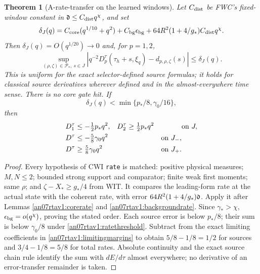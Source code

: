 \documentclass[11pt]{article}
\numberwithin{equation}{section}
\newtheorem{theorem}{Theorem}[section]
\begin{document}
\begin{theorem}[A-rate-transfer on the learned windows]
\label{an07rtav1:ratetransfer}
Let \(C_{\rm dist}\) be FWC's fixed-window constant in
\(\mathfrak d\le C_{\rm dist}q^\chi\), and set
\begin{equation}
 \delta_J(q)=C_{\rm core}(q^{1/10}+q^2)
      +C_{\rm bg}\epsilon_{\rm bg}
      +64R^2(1+4/g_*)C_{\rm dist}q^\chi.
 \label{an07rtav1:deltaJ}
\end{equation}
Then \(\delta_J(q)=O(q^{1/20})\to0\) and, for \(p=1,2\),
\begin{equation}
 \sup_{(\rho,\zeta)\in\mathcal P_*,\ s\in J}
 |q^{-2}D_p^\tau(\tau_h+s,\xi_q)-d_{p,\rho,\zeta}(s)|
                       \le\delta_J(q).
 \label{an07rtav1:ratelimit}
\end{equation}
This is uniform for the exact selector-defined source formulas;
it holds for classical source derivatives wherever defined and
in the almost-everywhere time sense. There is no core gate hit.
If
\begin{equation}
 \delta_J(q)<\min\{p_*/8,\gamma_0/16\},
 \label{an07rtav1:ratethreshold}
\end{equation}
then
\begin{align}
 D_1^\tau&\le-\tfrac12p_*q^2,&
 D_2^\tau&\ge\tfrac12p_*q^2&&\text{on }J,\notag\\
 D^\tau&\le-\tfrac58\gamma_0q^2&&&\text{on }J_-,\notag\\
 D^\tau&\ge\tfrac58\gamma_0q^2&&&\text{on }J_+.
 \label{an07rtav1:originalmargins}
\end{align}
\end{theorem}
\begin{proof}
Every hypothesis of CWI \texttt{rate} is matched: positive
physical measures; \(M,N\le2\); bounded strong support and
comparator; finite weak first moments; same \(\rho\); and
\(\zeta-X_*\ge g_*/4\) from WIT. It compares the leading-form
rate at the actual state with the coherent rate, with error
\(64R^2(1+4/g_*)\mathfrak d\). Apply it after
Lemmas \ref{an07rtav1:corerate} and
\ref{an07rtav1:backgroundrate}. Since \(\gamma_*>\chi\),
\(\epsilon_{\rm bg}=o(q^\chi)\), proving the stated order.
Each source error is below \(p_*/8\); their sum is below
\(\gamma_0/8\) under \eqref{an07rtav1:ratethreshold}.
Subtract from the exact limiting coefficients in
\eqref{an07rtav1:limitingmargins} to obtain
\(5/8-1/8=1/2\) for sources and
\(3/4-1/8=5/8\) for total rates.
Absolute continuity and the exact source chain rule identify
the sum with \(dE/d\tau\) almost everywhere; no derivative
of an error-transfer remainder is taken.
\end{proof}
\end{document}
